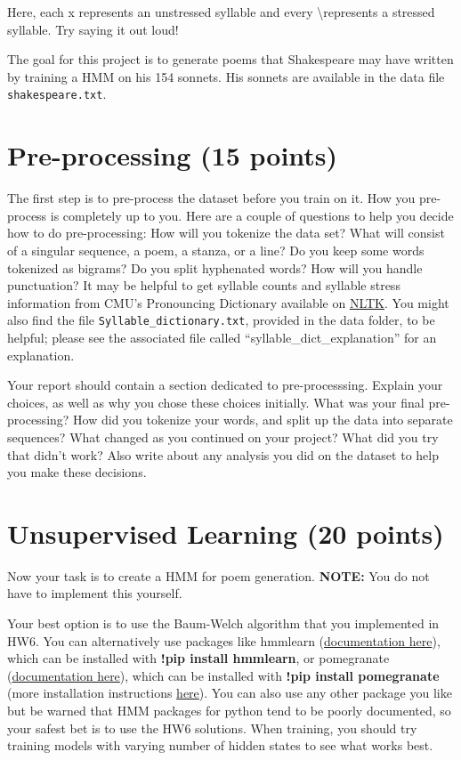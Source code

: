 Here, each x represents an unstressed syllable and every \textbackslash represents a stressed syllable. Try saying it out loud!

The goal for this project is to generate poems that Shakespeare may have written by training a HMM on his 154 sonnets. His sonnets are available in the data file \texttt{shakespeare.txt}.

\section{Pre-processing (15 points)}

The first step is to pre-process the dataset before you train on it. How you pre-process is completely up to you. Here are a couple of questions to help you decide how to do pre-processing: How will you tokenize the data set? What will consist of a singular sequence, a poem, a stanza, or a line? Do you keep some words tokenized as bigrams? Do you split hyphenated words? How will you handle punctuation? It may be helpful to get syllable counts and syllable stress information from CMU's Pronouncing Dictionary available on \href{https://www.nltk.org/api/nltk.corpus.reader.cmudict.html}{NLTK}. You might also find the file \texttt{Syllable\_dictionary.txt}, provided in the data folder, to be helpful; please see the associated file called ``syllable\_dict\_explanation'' for an explanation.

Your report should contain a section dedicated to pre-processsing. Explain your choices, as well as why you chose these choices initially. What was your final pre-processing? How did you tokenize your words, and split up the data into separate sequences? What changed as you continued on your project? What did you try that didn't work? Also write about any analysis you did on the dataset to help you make these decisions.


\section{Unsupervised Learning (20 points)}

Now your task is to create a HMM for poem generation. \textbf{NOTE:} You do not have to implement this yourself.

Your best option is to use the Baum-Welch algorithm that you implemented in HW6. You can alternatively use packages like hmmlearn (\href{https://hmmlearn.readthedocs.io/en/latest/}{documentation here}), which can be installed with \textbf{!pip install hmmlearn}, or pomegranate  (\href{https://pomegranate.readthedocs.io/en/latest/HiddenMarkovModel.html}{documentation here}), which can be installed with \textbf{!pip install pomegranate} (more installation instructions \href{https://pomegranate.readthedocs.io/en/latest/install.html}{here}). You can also use any other package you like but be warned that HMM packages for python tend to be poorly documented, so your safest bet is to use the HW6 solutions. When training, you should try training models with varying number of hidden states to see what works best.

